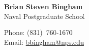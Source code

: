 \documentclass[11pt]{article}
\begin{document}
\begin{minipage}[t]{0.62\textwidth}
  {\LARGE\bfseries Brian Steven Bingham}\\[0.6ex]
  Naval Postgraduate School
\end{minipage}%
\hfill
\begin{minipage}[t]{0.36\textwidth}
  \raggedleft\small
  Phone: (831)~760-1670\\
  Email: \href{mailto:bbingham@nps.edu}{bbingham@nps.edu}
\end{minipage}

\vspace{0.5ex}

\nocite{*}





\end{document}
